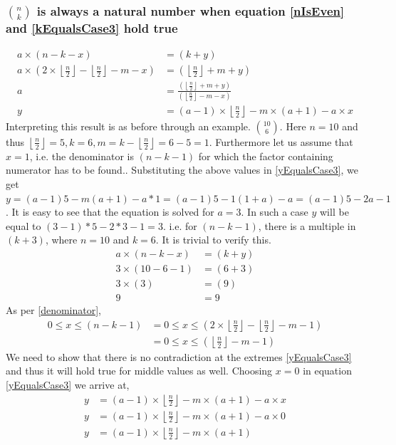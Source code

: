 \documentclass[10pt, twoside]{article}
\newcommand*{\Combination}[2]{\binom{#1}{#2}}%
\newcommand{\floordivision}[2]{\left\lfloor \frac{#1}{#2} \right\rfloor}
\begin{document}
\subsubsection{$\Combination{n}{k}$ is always a natural number when equation \eqref{nIsEven} and \eqref{kEqualsCase3} hold true}\label{ProofkEqualsCase3}
\begin{align}
	a \times (n-k-x) &= (k+y) \nonumber \\
	a \times (2\times \floordivision{n}{2} - \floordivision{n}{2} - m - x) &= (\floordivision{n}{2} + m + y) \nonumber \\
	a &= \frac{(\floordivision{n}{2} +m + y)}{(\floordivision{n}{2} -m - x)} \nonumber \\
	y &= (a-1)\times \floordivision{n}{2} - m \times (a+1) - a\times x \label{yEqualsCase3}	
\end{align}
Interpreting this result is as before through an example.\newline
$\Combination{10}{6}$. Here $n = 10$ and thus $\floordivision{n}{2} = 5, k = 6, m = k - \floordivision{n}{2} = 6 - 5 = 1$. Furthermore let us assume that $x = 1$, i.e. the denominator is $(n-k-1)$ for which the factor containing numerator has to be found.\newline.
Substituting the above values in \eqref{yEqualsCase3}, we get  $y = (a-1)5-m(a+1)-a*1 = (a-1)5-1(1+a)-a = (a-1)5-2a-1$\newline. 
It is easy to see that the equation is solved for $a = 3$. In such a case $y$ will be equal to $(3-1)*5-2*3-1 = 3$. i.e. for $(n-k-1)$, there is a multiple in $(k+3)$, where $n=10$ and $k=6$. It is trivial to verify this.
\begin{align*}
	a \times (n-k-x) &= (k+y) \\
	3 \times (10-6-1) &= (6+3) \\
	3 \times (3) &= (9) \\
	9 &= 9 
\end{align*}
As per \eqref{denominator}, 
\begin{align}
	0 \leq x \leq (n-k-1) &= 0 \leq x \leq (2\times \floordivision{n}{2}-\floordivision{n}{2}-m-1) \nonumber \\
	&= 0 \leq x \leq (\floordivision{n}{2}-m-1) \label{LimitOfXforYEqualsCase3}
\end{align}
We need to show that there is no contradiction at the extremes \eqref{yEqualsCase3} and thus it will hold true for middle values as well.
Choosing $x = 0$ in equation \eqref{yEqualsCase3} we arrive at,
\begin{align*}
	y &= (a-1)\times \floordivision{n}{2} - m \times (a+1) - a\times x \\
	y &= (a-1)\times \floordivision{n}{2} - m \times (a+1) - a\times 0 \\
	y &= (a-1)\times \floordivision{n}{2} - m \times (a+1)
\end{align*}
\end{document}
